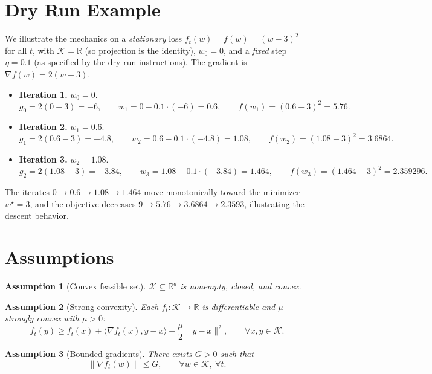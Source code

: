 \documentclass[11pt]{article}
\newtheorem{assumption}{Assumption}
\begin{document}
\section*{Dry Run Example}
We illustrate the mechanics on a \emph{stationary} loss
$f_t(w) = f(w) = (w-3)^2$ for all $t$, with $\mathcal{K} = \mathbb{R}$ 
(so projection is the identity), $w_0 = 0$, and a \emph{fixed} step
$\eta = 0.1$ (as specified by the dry-run instructions). 
The gradient is $\nabla f(w) = 2(w-3)$.

\begin{itemize}
  \item \textbf{Iteration 1.} $w_0 = 0$.
        \[
        g_0 = 2(0-3) = -6, \qquad
        w_1 = 0 - 0.1\cdot(-6) = 0.6, \qquad
        f(w_1) = (0.6-3)^2 = 5.76 .
        \]
  \item \textbf{Iteration 2.} $w_1 = 0.6$.
        \[
        g_1 = 2(0.6-3) = -4.8, \qquad
        w_2 = 0.6 - 0.1\cdot(-4.8) = 1.08, \qquad
        f(w_2) = (1.08-3)^2 = 3.6864 .
        \]
  \item \textbf{Iteration 3.} $w_2 = 1.08$.
        \[
        g_2 = 2(1.08-3) = -3.84, \qquad
        w_3 = 1.08 - 0.1\cdot(-3.84) = 1.464, \qquad
        f(w_3) = (1.464-3)^2 = 2.359296 .
        \]
\end{itemize}
The iterates $0 \to 0.6 \to 1.08 \to 1.464$ move monotonically toward the 
minimizer $w^\star = 3$, and the objective decreases 
$9 \to 5.76 \to 3.6864 \to 2.3593$, illustrating the descent behavior.

\section*{Assumptions}

\begin{assumption}[Convex feasible set]
$\mathcal{K} \subseteq \mathbb{R}^d$ is nonempty, closed, and convex.
\end{assumption}

\begin{assumption}[Strong convexity]
Each $f_t:\mathcal{K}\to\mathbb{R}$ is differentiable and $\mu$-strongly convex with $\mu>0$:
\[
f_t(y) \ge f_t(x) + \langle \nabla f_t(x), y-x\rangle + \frac{\mu}{2}\|y-x\|^2,
\qquad \forall x,y \in \mathcal{K}.
\]
\end{assumption}

\begin{assumption}[Bounded gradients]
There exists $G>0$ such that
\[
\|\nabla f_t(w)\| \le G, \qquad \forall w\in\mathcal{K},\ \forall t.
\]
\end{assumption}
\end{document}
